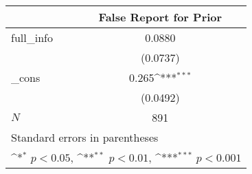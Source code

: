 {
\def\sym#1{\ifmmode^{#1}\else\(^{#1}\)\fi}
\begin{tabular}{l*{1}{c}}
\hline\hline
            &\multicolumn{1}{c}{False Report for Prior}\\
\hline
full\_info   &      0.0880         \\
            &    (0.0737)         \\
[1em]
\_cons      &       0.265\sym{***}\\
            &    (0.0492)         \\
\hline
\(N\)       &         891         \\
\hline\hline
\multicolumn{2}{l}{\footnotesize Standard errors in parentheses}\\
\multicolumn{2}{l}{\footnotesize \sym{*} \(p<0.05\), \sym{**} \(p<0.01\), \sym{***} \(p<0.001\)}\\
\end{tabular}
}
